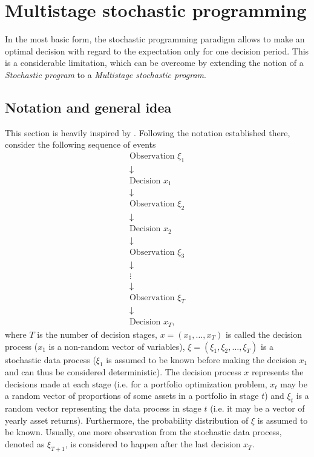 \section{Multistage stochastic programming}
In the most basic form, the stochastic programming paradigm allows to make an optimal decision with regard to the expectation only for one decision period. This is a considerable limitation, which can be overcome by extending the notion of a \textit{Stochastic program} to a \textit{Multistage stochastic program}.

\subsection{Notation and general idea}
This section is heavily inspired by \cite[Section 3.3.]{stochasticprogrammingbible}.
Following the notation established there, consider the following sequence of events
\begin{equation*}
\begin{gathered}
\mathrm{Observation} \,\, \xi_1
\\
\downarrow
\\
\mathrm{Decision} \, \, x_1
\\
\downarrow
\\
\mathrm{Observation} \,\, \xi_2
\\
\downarrow
\\
\mathrm{Decision} \,\, x_2
\\
\downarrow
\\
\mathrm{Observation} \,\, \xi_3
\\
\downarrow
\\
\vdots
\\
\downarrow
\\
\mathrm{Observation} \,\, \xi_T
\\
\downarrow
\\
\mathrm{Decision} \,\, x_T,
\end{gathered}
\end{equation*}
where $T$ is the number of decision stages, $x=(x_1,\dots,x_T)$ is called the decision process ($x_1$ is a non-random vector of variables), $\xi = (\xi_1,\xi_2,\dots,\xi_{T})$ is a stochastic data process ($\xi_1$ is assumed to be known before making the decision $x_1$ and can thus be considered deterministic).  The decision process $x$ represents the decisions made at each stage (i.e. for a portfolio optimization problem, $x_t$ may be a random vector of proportions of some assets in a portfolio in stage $t$) and $\xi_{t}$ is a random vector representing the data process in stage $t$ (i.e. it may be a vector of yearly asset returns). Furthermore, the probability distribution of $\xi$ is assumed to be known. Usually, one more observation from the stochastic data process, denoted as $\xi_{T+1}$, is considered to happen after the last decision $x_T$.
